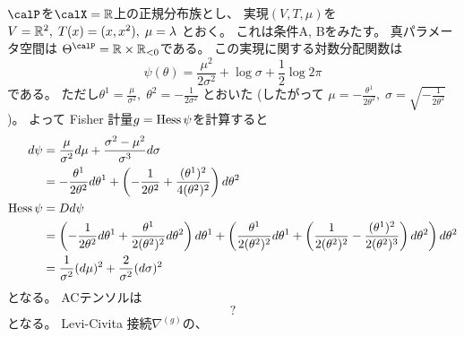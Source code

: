 \documentclass[report]{jlreq}
\begin{document}
\begin{example}[正規分布族]
    $\calP$を$\calX = \R$上の正規分布族とし、
    実現$(V, T, \mu)$を
    $V = \mathbb{R}^2, \;
        T(x) = (x, x^2), \;
        \mu = \lambda$
    とおく。
    これは条件A, Bをみたす。
    真パラメータ空間は
    $\Theta^\calP = \R \times \R_{< 0}$である。
    この実現に関する対数分配関数は
    \begin{equation}
        \psi(\theta)
            = \frac{\mu^2}{2 \sigma^2}
            + \log \sigma
            + \frac{1}{2} \log 2\pi
    \end{equation}
    である。
    ただし$\theta^1 = \frac{\mu}{\sigma^2}, \;
        \theta^2 = -\frac{1}{2 \sigma^2}$
    とおいた
    (したがって
    $\mu = -\frac{\theta^1}{2\theta^2}, \;
        \sigma = \sqrt{-\frac{1}{2\theta^2}}$
    )。
    よって
    Fisher 計量$g = \operatorname{Hess}\psi$を計算すると
    \begin{alignat}{1}
        d\psi
            &=
                \frac{\mu}{\sigma^2}
                d\mu
                + \frac{\sigma^2 - \mu^2}{\sigma^3}
                d\sigma
                \\
            &=
                -\frac{\theta^1}{2\theta^2} d\theta^1
                +\left({
                    -\frac{1}{2\theta^2}
                    + \frac{(\theta^1)^2}{4(\theta^2)^2}
                }\right)
                d\theta^2
                \\
        \operatorname{Hess}\psi
            &= Dd\psi \\
            &=
                \left({
                    -\frac{1}{2\theta^2}
                    d\theta^1
                    + \frac{\theta^1}{2(\theta^2)^2}
                    d\theta^2
                }\right)
                d\theta^1
                +
                \left({
                    \frac{\theta^1}{2(\theta^2)^2}
                    d\theta^1
                    + \left({
                        \frac{1}{2(\theta^2)^2}
                        - \frac{(\theta^1)^2}{2(\theta^2)^3}
                    }\right)
                    d\theta^2
                }\right)
                d\theta^2
                \\
            &=
                \frac{1}{\sigma^2} (d\mu)^2
                + \frac{2}{\sigma^2} (d\sigma)^2
    \end{alignat}
    となる。
    ACテンソルは
    \begin{equation}
        ?
    \end{equation}
    となる。
    Levi-Civita 接続$\nabla^{(g)}$の、

\end{example}
\end{document}

